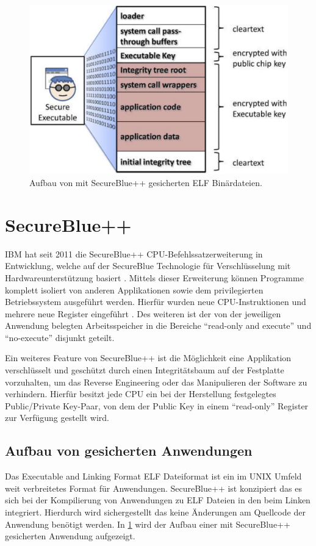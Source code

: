 \documentclass[ngerman]{sig-alternate-05-2015}
\begin{document}
\begin{figure}
	\centering
	\includegraphics[width=\columnwidth]{aufbau2}
	\caption{Aufbau von mit SecureBlue++ gesicherten ELF Binärdateien. \cite{boivie2013secureblue++:big}}
	\label{fig:aufbau}
\end{figure}

\section{SecureBlue++}
IBM hat seit 2011 die SecureBlue++ CPU-Befehlssatz\-erweiterung in Entwicklung, welche auf der SecureBlue Technologie für Verschlüsselung mit Hardwareunterstützung basiert \cite{ibm_2006, boiviesecureblue++:small}. Mittels dieser Erweiterung können Programme komplett isoliert von anderen Applikationen sowie dem privilegierten Betriebssystem ausgeführt werden. Hierfür wurden neue CPU-Instruktionen und mehrere neue Register eingeführt \cite{boivie2013secureblue++:big}. Des weiteren ist der von der jeweiligen Anwendung belegten Arbeitsspeicher in die Bereiche \enquote{read-only and execute} und \enquote{no-execute} disjunkt geteilt. 

Ein weiteres Feature von SecureBlue++ ist die Möglichkeit eine Applikation verschlüsselt und geschützt durch einen Integritätsbaum auf der Festplatte vorzuhalten, um das Reverse Engineering oder das Manipulieren der Software zu verhindern. Hierfür besitzt jede CPU ein bei der Herstellung festgelegtes Public/Private Key-Paar, von dem der Public Key in einem \enquote{read-only} Register zur Verfügung gestellt wird.

\subsection{Aufbau von gesicherten Anwendungen}
Das Executable and Linking Format ELF Dateiformat ist ein im UNIX Umfeld weit verbreitetes Format für Anwendungen. SecureBlue++ ist konzipiert das es sich bei der Kompilierung von Anwendungen zu ELF Dateien in den beim Linken integriert. Hierdurch wird sichergestellt das keine Änderungen am Quellcode der Anwendung benötigt werden. 
In \cref{fig:aufbau} wird der Aufbau einer mit SecureBlue++ gesicherten Anwendung aufgezeigt. 
\end{document}
